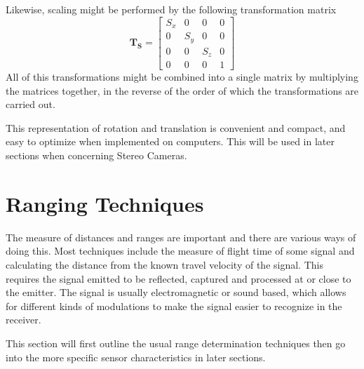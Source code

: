 Likewise, scaling might be performed by the following transformation matrix
\begin{equation}
    \label{chap2:eq-TransformationMatrixScaling}
    \mathbf{T_S} = \left [ \begin{array}{cccc}
                                S_x & 0 & 0 & 0 \\
                                0 & S_y & 0 & 0 \\
                                0 & 0 & S_z & 0 \\
                                0 & 0 & 0 & 1 
                                 \end{array} \right]
\end{equation}
All of this transformations might be combined into a single matrix by multiplying the
matrices together, in the reverse of the order of which the transformations are carried
out. 

This representation of rotation and translation is convenient and compact, and easy to
optimize when implemented on computers. This will be used in later sections when
concerning Stereo Cameras. 


\section{Ranging Techniques}
The measure of distances and ranges are important and there are various ways of doing
this. Most techniques include the measure of flight time of some signal and calculating
the distance from the known travel velocity of the signal. This requires the signal
emitted to be reflected, captured and processed at or close to the emitter. The signal is
usually electromagnetic or sound based, which allows for different kinds of modulations to
make the signal easier to recognize in the receiver.


This section will first outline the usual range determination techniques then go into the
more specific sensor characteristics in later sections.


